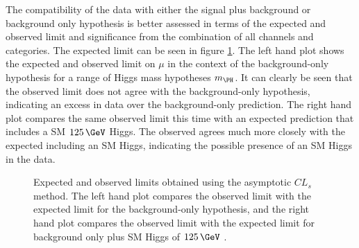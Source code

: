 The compatibility of the data with either the signal plus background or
background only hypothesis is better assessed in terms of the expected and observed
limit and significance from the combination of all channels and categories. The
expected limit can be seen in figure \ref{fig:results-limit}. The left hand plot
shows the expected and observed limit on $\mu$ in the context of the
background-only hypothesis for a range of Higgs mass hypotheses $m_{\PH}$. 
It can clearly be seen that the observed limit does not agree with the
background-only hypothesis, indicating an excess in data over the background-only
prediction. The right hand plot compares the same observed limit this time with
an expected prediction that includes a \ac{SM} $125\,\GeV$ Higgs. The observed
agrees much more closely with the expected including an \ac{SM} Higgs,
indicating the possible presence of an \ac{SM} Higgs in the data. 

\begin{figure}[h!]
\caption[Expected and observed limits on $\mu$ obtained using the asymptotic $CL_{s}$
method.]{Expected and observed limits obtained using the asymptotic $CL_{s}$
method. The left hand plot compares the observed limit with the expected limit
for the background-only hypothesis, and the right hand plot compares the observed
limit with the expected limit for background only plus \ac{SM} Higgs of
$125\,\GeV$ \cite{HIG-13-004}. }
\label{fig:results-limit}
\end{figure}

